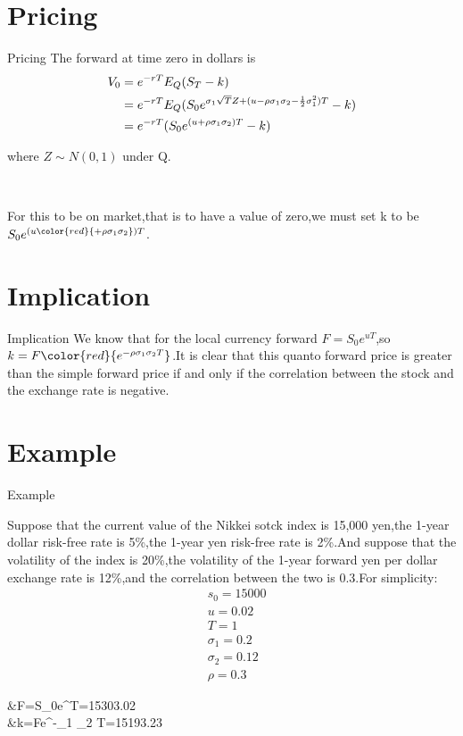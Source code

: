 \documentclass[15pt]{beamer}
\begin{document}
\section{Pricing}
	\begin{frame}{Pricing}
		The forward at time zero in dollars is  
		\begin{align}
			V_0 & =e^{-rT}E_Q(S_T-k)\notag\\
				& =e^{-rT}E_Q(S_0e^{\sigma_1\sqrt{T}Z +(u -\rho \sigma_1 \sigma_2 -\frac{1}{2}\sigma_1^2)T}-k)\notag\\
				& =e^{-rT}(S_0e^{(u +\rho \sigma_1 \sigma_2)T}-k)
		\end{align}
		
		where $Z\sim N(0,1)$ under Q.
		
		\
		
		For this to be on market,that is to have a value of zero,we must set k to be $S_0e^{(u {\color {red}{+\rho \sigma_1 \sigma_2}})T}$.
		
	\end{frame}


\section{Implication}
	\begin{frame}{Implication}
	We know that for the local currency forward $F=S_0e^{u T}$,so $k=F{\color {red}{e^{-\rho \sigma_1 \sigma_2 T}}}$.It is clear that this quanto forward price is greater than the simple forward price if and only if the correlation between the stock and the exchange rate is negative.  
	\end{frame}


\section{Example}
	\begin{frame}{Example}
	
	Suppose that the current value of the Nikkei sotck index is 15,000 yen,the 1-year dollar risk-free rate is 5\%,the 1-year yen risk-free rate is 2\%.And suppose that the volatility of the index is 20\%,the volatility of the 1-year forward yen per dollar exchange rate is 12\%,and the correlation between the two is 0.3.For simplicity:
	\begin{align*}
	&s_0=15000\\  
	&u=0.02  \\
	&T=1  \\
	&\sigma_1=0.2\\  
	&\sigma_2=0.12 \\ 
	&\rho=0.3 
	\end{align*}
	
	\begin{flalign*}
	&F=S_0e^{\mu T}=15303.02\\
	&k=Fe^{-\rho \sigma_1 \sigma_2 T}=15193.23
	\end{flalign*}
	
	\end{frame}
\end{document}
